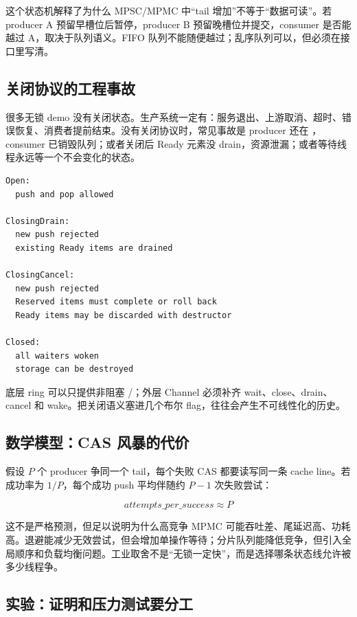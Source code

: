 这个状态机解释了为什么 MPSC/MPMC 中“tail 增加”不等于“数据可读”。若 producer A 预留早槽位后暂停，producer B 预留晚槽位并提交，consumer 是否能越过 A，取决于队列语义。FIFO 队列不能随便越过；乱序队列可以，但必须在接口里写清。

\subsection{关闭协议的工程事故}

很多无锁 demo 没有关闭状态。生产系统一定有：服务退出、上游取消、超时、错误恢复、消费者提前结束。没有关闭协议时，常见事故是 producer 还在 ，consumer 已销毁队列；或者关闭后 Ready 元素没 drain，资源泄漏；或者等待线程永远等一个不会变化的状态。

\begin{lstlisting}[numbers=none,caption={Channel 关闭状态机}]
Open:
  push and pop allowed

ClosingDrain:
  new push rejected
  existing Ready items are drained

ClosingCancel:
  new push rejected
  Reserved items must complete or roll back
  Ready items may be discarded with destructor

Closed:
  all waiters woken
  storage can be destroyed
\end{lstlisting}

底层 ring 可以只提供非阻塞 /；外层 Channel 必须补齐 wait、close、drain、cancel 和 wake。把关闭语义塞进几个布尔 flag，往往会产生不可线性化的历史。

\subsection{数学模型：CAS 风暴的代价}

假设 \(P\) 个 producer 争同一个 tail，每个失败 CAS 都要读写同一条 cache line。若成功率为 \(1/P\)，每个成功 push 平均伴随约 \(P-1\) 次失败尝试：

\[
attempts\_per\_success \approx P
\]

这不是严格预测，但足以说明为什么高竞争 MPMC 可能吞吐差、尾延迟高、功耗高。退避能减少无效尝试，但会增加单操作等待；分片队列能降低竞争，但引入全局顺序和负载均衡问题。工业取舍不是“无锁一定快”，而是选择哪条状态线允许被多少线程争。

\subsection{实验：证明和压力测试要分工}

